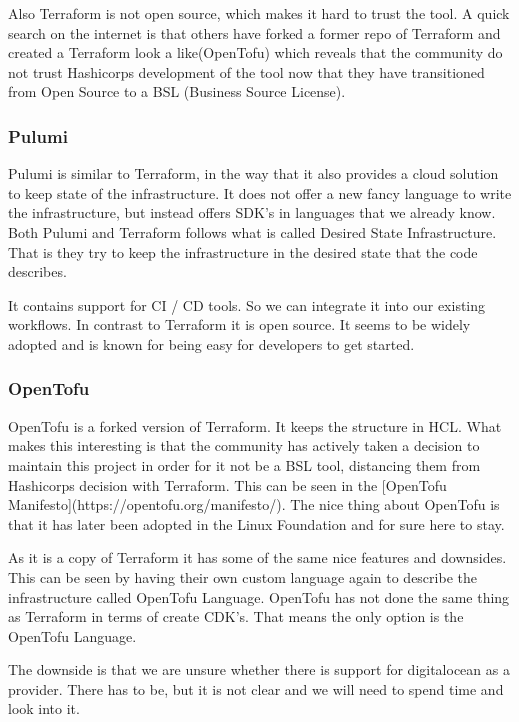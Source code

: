 Also Terraform is not open source, which makes it hard to trust the tool. A quick search on the internet is that others have forked a former repo of Terraform and created a Terraform look a like(OpenTofu) which reveals that the community do not trust Hashicorps development of the tool now that they have transitioned from Open Source to a BSL (Business Source License).

\subsubsection{Pulumi}

Pulumi is similar to Terraform, in the way that it also provides a cloud solution to keep state of the infrastructure. It does not offer a new fancy language to write the infrastructure, but instead offers SDK’s in languages that we already know. Both Pulumi and Terraform follows what is called Desired State Infrastructure. That is they try to keep the infrastructure in the desired state that the code describes.

It contains support for CI / CD tools. So we can integrate it into our existing workflows. In contrast to Terraform it is open source. It seems to be widely adopted and is known for being easy for developers to get started.

\subsubsection{OpenTofu}

OpenTofu is a forked version of Terraform. It keeps the structure in HCL. What makes this interesting is that the community has actively taken a decision to maintain this project in order for it not be a BSL tool, distancing them from Hashicorps decision with Terraform. This can be seen in the [OpenTofu Manifesto](https://opentofu.org/manifesto/). The nice thing about OpenTofu is that it has later been adopted in the Linux Foundation and for sure here to stay.

As it is a copy of Terraform it has some of the same nice features and downsides. This can be seen by having their own custom language again to describe the infrastructure called OpenTofu Language. OpenTofu has not done the same thing as Terraform in terms of create CDK’s. That means the only option is the OpenTofu Language.

The downside is that we are unsure whether there is support for digitalocean as a provider. There has to be, but it is not clear and we will need to spend time and look into it.

